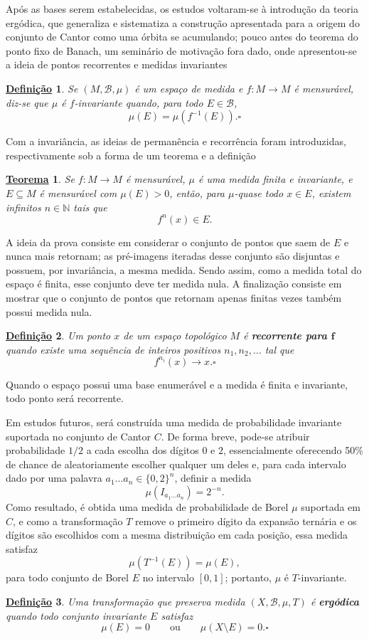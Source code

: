 \documentclass[12pt, a4paper]{article}
\newtheorem*{def*}{\underline{Definição}}
\newtheorem*{theorem*}{\underline{Teorema}}
\theoremstyle{definition}
\newcommand{\N}{\mathbb{N}}
\begin{document}
Após as bases serem estabelecidas, os estudos voltaram-se à introdução da teoria ergódica, que generaliza e sistematiza a construção apresentada para a origem do conjunto de Cantor como uma órbita se acumulando; pouco antes do teorema do ponto fixo de Banach, um seminário de motivação fora dado, onde apresentou-se a ideia de pontos recorrentes e medidas invariantes
\begin{def*}
	Se $(M,\mathcal{B},\mu)$ é um espaço de medida e $f:M\to M$ é mensurável, diz-se que $\mu$ é $f$-invariante quando, para todo $E\in\mathcal{B}$,
	\[
		\mu(E)=\mu(f^{-1}(E)). \square
	\]
\end{def*}
Com a invariância, as ideias de permanência e recorrência foram introduzidas, respectivamente sob a forma de um teorema e a definição
\begin{theorem*}
	Se $f:M\to M$ é mensurável, $\mu$ é uma medida finita e invariante, e $E\subseteq M$ é mensurável com $\mu(E)>0$, então, para $\mu$-quase todo $x\in E$, existem infinitos $n\in\N$ tais que
	\[
		f^n(x)\in E.
	\]
\end{theorem*}
A ideia da prova consiste em considerar o conjunto de pontos que saem de $E$ e nunca mais retornam; as pré-imagens iteradas desse conjunto são disjuntas e possuem, por invariância, a mesma medida. Sendo assim, como a medida total do espaço é finita, esse conjunto deve ter medida nula. A finalização consiste em mostrar que o conjunto de pontos que retornam apenas finitas vezes também possui medida nula.
\begin{def*}
	Um ponto $x$ de um espaço topológico $M$ é \textbf{recorrente para $\mathbf{f}$} quando existe uma sequência de inteiros positivos $n_1,n_2,\ldots$ tal que
	\[
		f^{n_i}(x)\longrightarrow x. \square
	\]
\end{def*}
Quando o espaço possui uma base enumerável e a medida é finita e invariante, todo ponto será recorrente.

Em estudos futuros, será construída uma medida de probabilidade invariante suportada no conjunto de Cantor $C$. De forma breve, pode-se atribuir probabilidade $1/2$ a cada escolha dos dígitos $0$ e $2$, essencialmente oferecendo 50\% de chance de aleatoriamente escolher qualquer um deles e, para cada intervalo dado por uma palavra $a_1\ldots a_n\in\{0 ,2\}^n$, definir a medida
\[
	\mu(I_{a_1\ldots a_n})=2^{-n}.
\]
Como resultado, é obtida uma medida de probabilidade de Borel $\mu$ suportada em $C$, e como a transformação $T$ remove o primeiro dígito da expansão ternária e os dígitos são escolhidos com a mesma distribuição em cada posição, essa medida satisfaz
\[
	\mu(T^{-1}(E))=\mu(E),
\]
para todo conjunto de Borel $E$ no intervalo \([0, 1]\); portanto, $\mu$ é $T$-invariante.
\begin{def*}
	Uma transformação que preserva medida $(X,\mathcal{B},\mu,T)$ é \textbf{ergódica} quando todo conjunto invariante $E$ satisfaz
	\[
		\mu(E)=0
		\qquad\text{ou}\qquad
		\mu(X\setminus E)=0. \square
	\]
\end{def*}
\end{document}
